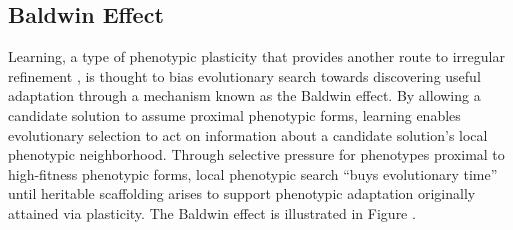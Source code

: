 \subsection{Baldwin Effect}
Learning, a type of phenotypic plasticity that provides another route to irregular refinement \cite{Clune2011OnRegularity}, is thought to bias evolutionary search towards discovering useful adaptation through a mechanism known as the Baldwin effect.\cite{Downing2010TheNetworks} By allowing a candidate solution to assume proximal phenotypic forms, learning enables evolutionary selection to act on information about a candidate solution's local phenotypic neighborhood. Through selective pressure for phenotypes proximal to high-fitness phenotypic forms, local phenotypic search ``buys evolutionary time'' until heritable scaffolding arises to support phenotypic adaptation originally attained via plasticity.\cite{Downing2010TheNetworks} The Baldwin effect is illustrated in Figure .